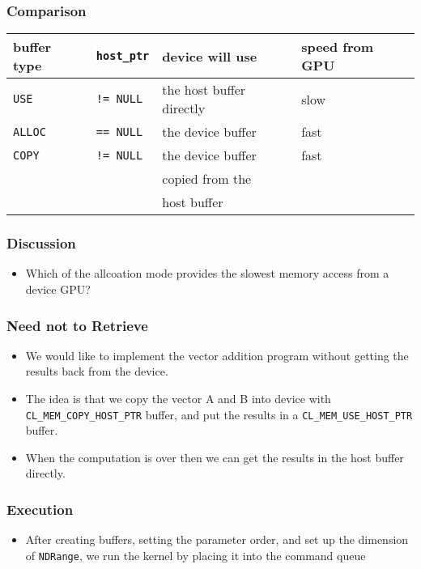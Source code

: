 \documentclass{beamer}
\begin{document}
\begin{frame}
  \frametitle{Comparison}
  \begin{tabular}{|l|l|l|l|} \hline
    buffer type & {\tt host\_ptr} & device will use & speed from GPU \\ \hline
    {\tt USE} & {\tt != NULL} & the host buffer directly & slow \\ \hline
    {\tt ALLOC} & {\tt == NULL} & the device buffer & fast \\ \hline
    {\tt COPY} & {\tt != NULL} & the device buffer & fast \\
    & & copied from the &  \\ 
    & & host buffer & \\ \hline
  \end{tabular}
\end{frame}

\begin{frame}
  \frametitle{Discussion}
  \begin{itemize}
    \item Which of the allcoation mode provides the slowest memory
      access from a device GPU?
  \end{itemize}
\end{frame}

\begin{frame}
  \frametitle{Need not to Retrieve}
  \begin{itemize}
    \item We would like to implement the vector addition program
      without getting the  results back from the device.
    \item The idea is that we copy the vector A and B into device with
      {\tt CL\_MEM\_COPY\_HOST\_PTR} buffer, and put the results in a
      {\tt CL\_MEM\_USE\_HOST\_PTR} buffer.
    \item When the computation is over then we can get the results in
      the host buffer directly.
  \end{itemize}
\end{frame}

\begin{frame}
\end{frame}

\begin{frame}
  \frametitle{Execution}
  \begin{itemize}
    \item After creating buffers, setting the parameter order, and
      set up the dimension of {\tt NDRange}, we run the kernel by
      placing it into the command queue
  \end{itemize}
\end{frame}
\end{document}

